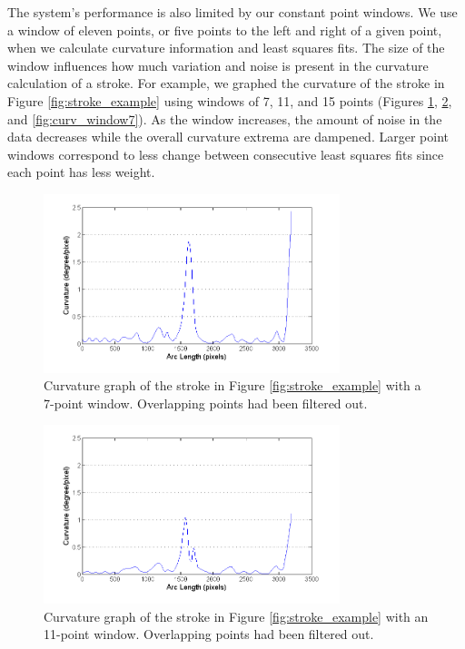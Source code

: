 \documentclass[10pt]{acmsiggraph}          %
\begin{document}
The system's performance is also limited by our constant point windows. We use a window of eleven points, or five points to the left and right of a given point, when we calculate curvature information and least squares fits. The size of the window influences how much variation and noise is present in the curvature calculation of a stroke. For example, we graphed the curvature of the stroke in Figure \ref{fig:stroke_example} using windows of 7, 11, and 15 points (Figures \ref{fig:curv_window3}, \ref{fig:curv_window5}, and \ref{fig:curv_window7}). As the window increases, the amount of noise in the data decreases while the overall curvature extrema are dampened. Larger point windows correspond to less change between consecutive least squares fits since each point has less weight.

\begin{figure}[t]
  \centering
  \includegraphics[width=3.4in]{curvature_win3.png}
  \caption{Curvature graph of the stroke in Figure \ref{fig:stroke_example} with a 7-point window. Overlapping points had been filtered out.}
  \label{fig:curv_window3}
\end{figure}

\begin{figure}[t]
  \centering
  \includegraphics[width=3.4in]{curvature_win5.png}
  \caption{Curvature graph of the stroke in Figure \ref{fig:stroke_example} with an 11-point window. Overlapping points had been filtered out.}
  \label{fig:curv_window5}
\end{figure}
\end{document}
